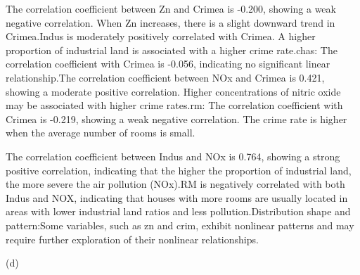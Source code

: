 \documentclass[
]{article}
\begin{document}
The correlation coefficient between Zn and Crimea is -0.200, showing a
weak negative correlation. When Zn increases, there is a slight downward
trend in Crimea.Indus is moderately positively correlated with Crimea. A
higher proportion of industrial land is associated with a higher crime
rate.chas: The correlation coefficient with Crimea is -0.056, indicating
no significant linear relationship.The correlation coefficient between
NOx and Crimea is 0.421, showing a moderate positive correlation. Higher
concentrations of nitric oxide may be associated with higher crime
rates.rm: The correlation coefficient with Crimea is -0.219, showing a
weak negative correlation. The crime rate is higher when the average
number of rooms is small.

The correlation coefficient between Indus and NOx is 0.764, showing a
strong positive correlation, indicating that the higher the proportion
of industrial land, the more severe the air pollution (NOx).RM is
negatively correlated with both Indus and NOX, indicating that houses
with more rooms are usually located in areas with lower industrial land
ratios and less pollution.Distribution shape and pattern:Some variables,
such as zn and crim, exhibit nonlinear patterns and may require further
exploration of their nonlinear relationships.

(d)
\end{document}
